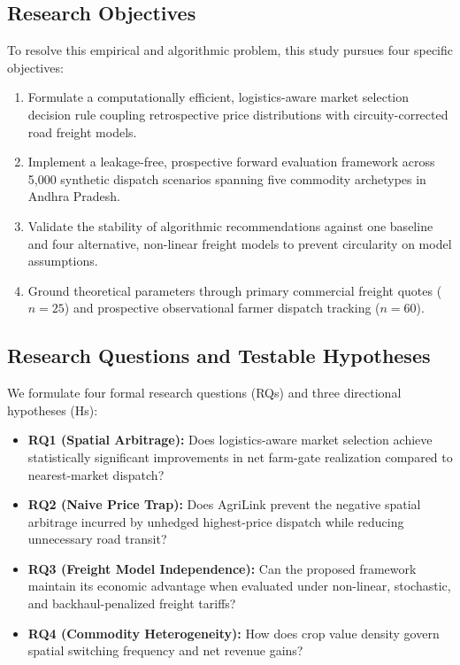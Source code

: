 \documentclass[journal]{IEEEtran}
\begin{document}
\subsection{Research Objectives}
To resolve this empirical and algorithmic problem, this study pursues four specific objectives:
\begin{enumerate}
    \item Formulate a computationally efficient, logistics-aware market selection decision rule coupling retrospective price distributions with circuity-corrected road freight models.
    \item Implement a leakage-free, prospective forward evaluation framework across 5,000 synthetic dispatch scenarios spanning five commodity archetypes in Andhra Pradesh.
    \item Validate the stability of algorithmic recommendations against one baseline and four alternative, non-linear freight models to prevent circularity on model assumptions.
    \item Ground theoretical parameters through primary commercial freight quotes ($n = 25$) and prospective observational farmer dispatch tracking ($n = 60$).
\end{enumerate}

\subsection{Research Questions and Testable Hypotheses}
We formulate four formal research questions (RQs) and three directional hypotheses (Hs):
\begin{itemize}
    \item \textbf{RQ1 (Spatial Arbitrage):} Does logistics-aware market selection achieve statistically significant improvements in net farm-gate realization compared to nearest-market dispatch?
    \item \textbf{RQ2 (Naive Price Trap):} Does AgriLink prevent the negative spatial arbitrage incurred by unhedged highest-price dispatch while reducing unnecessary road transit?
    \item \textbf{RQ3 (Freight Model Independence):} Can the proposed framework maintain its economic advantage when evaluated under non-linear, stochastic, and backhaul-penalized freight tariffs?
    \item \textbf{RQ4 (Commodity Heterogeneity):} How does crop value density govern spatial switching frequency and net revenue gains?
\end{itemize}
\end{document}
